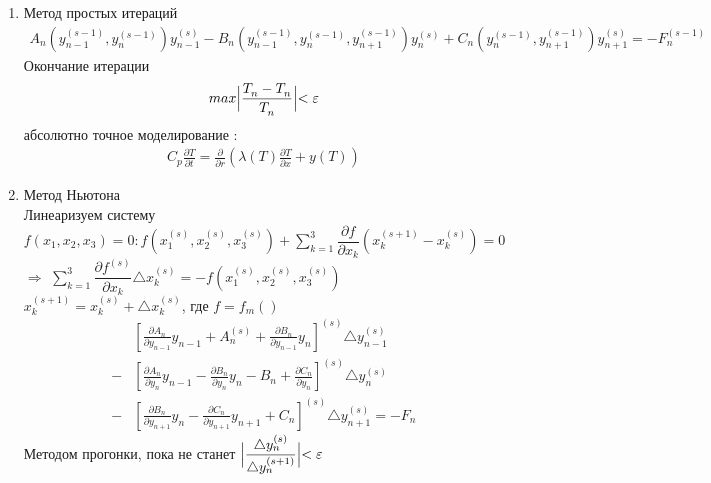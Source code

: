 \documentclass[12pt,a4paper]{article}
\begin{document}
	\begin{enumerate}
		\item Метод простых итераций\\
		\begin{align*}
		A_n(y^{(s-1)}_{n-1}, y^{(s-1)}_n)y^{(s)}_{n-1} - B_n(y^{(s-1)}_{n-1}, y^{(s-1)}_n, y^{(s-1)}_{n+1})y^{(s)}_n + C_n(y^{(s-1)}_n, y^{(s-1)}_{n+1})y^{(s)}_{n+1} = -F^{(s-1)}_n
		\end{align*}
		Окончание итерации 
		\begin{align*}
		max \Bigl| \frac{T^{}_n - T^{}_n}{T^{}_n} \Bigl | < \varepsilon
		\end{align*}
		абсолютно точное моделирование : \\
		\begin{align*}
		C_p \frac{\partial T}{\partial t} = \frac{\partial}{\partial r}\left( \lambda(T) \frac{\partial T}{\partial x} + y(T) \right)
		\end{align*}
		\item Метод Ньютона\\
		Линеаризуем систему $f(x_1, x_2, x_3) = 0 : f(x^{(s)}_1, x^{(s)}_2, x^{(s)}_3) + \sum_{k=1}^{3} \dfrac{\partial f}{\partial x_k}(x^{(s+1)}_k - x^{(s)}_k) = 0$ \\
		$\Rightarrow$ $\sum_{k=1}^{3} \dfrac{\partial f^{(s)}}{\partial x_k} \triangle x^{(s)}_k = -f(x^{(s)}_1, x^{(s)}_2, x^{(s)}_3)$\\
		$x^{(s+1)}_k = x^{(s)}_k + \triangle x^{(s)}_k$, где $f = f_m()$
		\begin{align*}
		&\left[ \frac{\partial A_n}{\partial y_{n-1}} y_{n-1} + A^{(s)}_n + \frac{\partial B_n}{\partial y_{n-1}} y_n \right]^{(s)}\triangle y^{(s)}_{n-1} \\
		- &\left[ \frac{\partial A_n}{\partial y_{n}} y_{n-1} - \frac{\partial B_n}{\partial y_{n}} y_n - B_n + \frac{\partial C_n}{\partial y_n} \right]^{(s)}\triangle y^{(s)}_{n} \\
		- &\left[ \frac{\partial B_n}{\partial y_{n+1}} y_{n} - \frac{\partial C_n}{\partial y_{n+1}} y_{n+1} + C_n  \right]^{(s)}\triangle y^{(s)}_{n+1} = -F_n
		\end{align*}
		Методом прогонки, пока не станет $\Bigl| \dfrac{\triangle y^{(s)}_n}{\triangle y^{(s+1)}_n} \Bigl| < \varepsilon$\\
	\end{enumerate}
\end{document}
